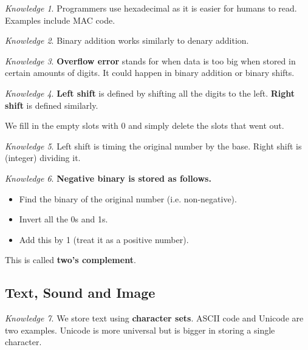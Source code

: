 \documentclass[8pt]{article}
\theoremstyle{remark}
\newtheorem{knowledge}{Knowledge}[subsection]
\begin{document}
        \begin{knowledge}
            Programmers use hexadecimal as it is easier for humans to read. Examples include MAC code.
        \end{knowledge}

        \begin{knowledge}
            Binary addition works similarly to denary addition.
        \end{knowledge}

        \begin{knowledge}
            \textbf{Overflow error} stands for when data is too big when stored in certain amounts of digits. It could happen in binary addition or binary shifts.
        \end{knowledge}

        \begin{knowledge}
            \textbf{Left shift} is defined by shifting all the digits to the left. \textbf{Right shift} is defined similarly.

            We fill in the empty slots with 0 and simply delete the slots that went out.
        \end{knowledge}

        \begin{knowledge}
            Left shift is timing the original number by the base. Right shift is (integer) dividing it.
        \end{knowledge}

        \begin{knowledge}
            \textbf{Negative binary is stored as follows.}
            \begin{itemize}
                \item Find the binary of the original number (i.e. non-negative).
                \item Invert all the 0s and 1s.
                \item Add this by 1 (treat it as a positive number).
            \end{itemize}
            This is called \textbf{two's complement}.
        \end{knowledge}

        \subsection{Text, Sound and Image}

        \begin{knowledge}
            We store text using \textbf{character sets}. ASCII code and Unicode are two examples. Unicode is more universal but is bigger in storing a single character.
        \end{knowledge}
\end{document}
